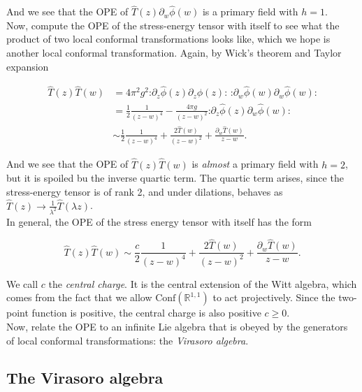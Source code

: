 \noindent And we see that the OPE of $\hat{T} (z) \partial_w \hat{\phi} (w)$ is a primary field with $h=1$. \\

\noindent Now, compute the OPE of the stress-energy tensor with itself to see what the product of two local conformal transformations looks like, which we hope is another local conformal transformation. Again, by Wick's theorem and Taylor expansion

\begin{align}
\hat{T} (z) \hat{T} (w) &= 4 \pi^2 g^2 \textbf{:} \partial_z \hat{\phi} (z) \partial_z \hat{\phi} (z) \textbf{:} \,\, \textbf{:} \partial_w \hat{\phi} (w) \partial_w \hat{\phi} (w) \textbf{:} \\
&= \frac{1}{2} \frac{1}{(z-w)^4} - \frac{4\pi g}{(z-w)^2} \textbf{:} \partial_z \hat{\phi} (z) \partial_w \hat{\phi} (w) \textbf{:} \\
&\sim \frac{1}{2} \frac{1}{(z-w)^4} + \frac{2 \hat{T} (w)}{(z-w)^2} + \frac{\partial_w \hat{T} (w)}{z-w}.
\end{align}

\noindent And we see that the OPE of $\hat{T} (z) \hat{T} (w)$ is \textit{almost} a primary field with $h=2$, but it is spoiled bu the inverse quartic term. The quartic term arises, since the stress-energy tensor is of rank 2, and under dilations, behaves as $\hat{T} (z) \rightarrow \frac{1}{\lambda^2} \hat{T} (\lambda z)$. \\

\noindent In general, the OPE of the stress energy tensor with itself has the form

\begin{equation}
\hat{T} (z) \hat{T} (w) \sim \frac{c}{2} \frac{1}{(z-w)^4} + \frac{2 \hat{T} (w)}{(z-w)^2} + \frac{\partial_w \hat{T} (w)}{z-w}.
\end{equation}

\noindent We call $c$ the \textit{central charge}. It is the central extension of the Witt algebra, which comes from the fact that we allow $\text{Conf}(\mathbb{R}^{1,1})$ to act projectively. Since the two-point function is positive, the central charge is also positive $c \ge 0$. \\

\noindent Now, relate the OPE to an infinite Lie algebra that is obeyed by the generators of local conformal transformations: the \textit{Virasoro algebra}.

\subsection*{The Virasoro algebra}

